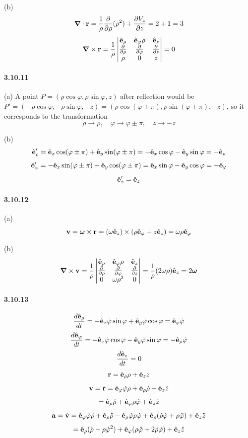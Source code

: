 \documentclass[a4paper]{article}
\begin{document}
(b) \[\boldsymbol{\nabla}\cdot\mathbf{r}=\frac{1}{\rho}\frac{\partial}{\partial\rho}(\rho^2)+\frac{\partial V_z}{\partial z}=2+1=3\] 
\[
\boldsymbol{\nabla}\times\mathbf{r}=\frac{1}{\rho}
\begin{vmatrix}
\hat{\mathbf{e}}_\rho&\hat{\mathbf{e}}_\varphi\rho&\hat{\mathbf{e}}_z\\
\frac{\partial}{\partial\rho}&\frac{\partial}{\partial\varphi}&\frac{\partial}{\partial z}\\
\rho&0&z
\end{vmatrix}=0
\]

\paragraph{3.10.11}
(a) A point $P=(\rho\cos\varphi,\rho\sin\varphi,z)$ after reflection would be $P'=(-\rho\cos\varphi,-\rho\sin\varphi,-z)=(\rho\cos(\varphi\pm\pi),\rho\sin(\varphi\pm\pi),-z)$, so it corresponds to the transformation 
\[
\rho\rightarrow\rho,\quad\varphi\rightarrow\varphi\pm\pi,\quad z\rightarrow-z
\]

(b) 
\[
\hat{\mathbf{e}}_\rho'=\hat{\mathbf{e}}_x\cos(\varphi\pm\pi)+\hat{\mathbf{e}}_y\sin(\varphi\pm\pi)=-\hat{\mathbf{e}}_x\cos\varphi-\hat{\mathbf{e}}_y\sin\varphi=-\hat{\mathbf{e}}_\rho
\]
\[
\hat{\mathbf{e}}_\varphi'=-\hat{\mathbf{e}}_x\sin(\varphi\pm\pi)+\hat{\mathbf{e}}_y\cos(\varphi\pm\pi)=\hat{\mathbf{e}}_x\sin\varphi-\hat{\mathbf{e}}_y\cos\varphi=-\hat{\mathbf{e}}_\varphi
\]
\[
\hat{\mathbf{e}}_z'=\hat{\mathbf{e}}_z
\]

\paragraph{3.10.12}
(a) 
\[
\mathbf{v}=\boldsymbol{\omega}\times\mathbf{r}=(\omega\hat{\mathbf{e}}_z)\times(\rho\hat{\mathbf{e}}_\varphi+z\hat{\mathbf{e}}_z)=\omega\rho\hat{\mathbf{e}}_\varphi
\]

(b)
\[
\boldsymbol{\nabla}\times\mathbf{v}=\frac{1}{\rho}
\begin{vmatrix}
\hat{\mathbf{e}}_\rho&\hat{\mathbf{e}}_\varphi\rho&\hat{\mathbf{e}}_z\\
\frac{\partial}{\partial\rho}&\frac{\partial}{\partial\varphi}&\frac{\partial}{\partial z}\\
0&\omega\rho^2&0
\end{vmatrix}=
\frac{1}{\rho}(2\omega\rho)\hat{\mathbf{e}}_z=2\boldsymbol{\omega}
\]

\paragraph{3.10.13}
\[
\frac{d\hat{\mathbf{e}}_\rho}{dt}=-\hat{\mathbf{e}}_x\dot{\varphi}\sin\varphi+\hat{\mathbf{e}}_y\dot{\varphi}\cos\varphi=\hat{\mathbf{e}}_\varphi\dot{\varphi}
\]
\[
\frac{d\hat{\mathbf{e}}_\varphi}{dt}=-\hat{\mathbf{e}}_x\dot{\varphi}\cos\varphi-\hat{\mathbf{e}}_y\dot{\varphi}\sin\varphi=-\hat{\mathbf{e}}_\rho\dot{\varphi}
\]
\[
\frac{d\hat{\mathbf{e}}_z}{dt}=0
\]
\[
\mathbf{r}=\hat{\mathbf{e}}_\rho\rho+\hat{\mathbf{e}}_z z
\]
\[
\mathbf{v}=\dot{\mathbf{r}}=\hat{\mathbf{e}}_\varphi\dot{\varphi}\rho+\hat{\mathbf{e}}_\rho\dot{\rho}+\hat{\mathbf{e}}_z\dot{z}\]
\[
=\hat{\mathbf{e}}_\rho\dot{\rho}+\hat{\mathbf{e}}_\varphi\rho\dot{\varphi}+\hat{\mathbf{e}}_z\dot{z}
\]
\[
\mathbf{a}=\dot{\mathbf{v}}=\hat{\mathbf{e}}_\varphi\dot{\varphi}\dot{\rho}+\hat{\mathbf{e}}_\rho\Ddot{\rho}-\hat{\mathbf{e}}_\rho\dot{\varphi}\rho\dot{\varphi}+\hat{\mathbf{e}}_\rho(\dot{\rho}\dot{\varphi}+\rho\Ddot{\varphi})+\hat{\mathbf{e}}_z\Ddot{z}
\]
\[
=\hat{\mathbf{e}}_\rho(\Ddot{\rho}-\rho\dot{\varphi
}^2)+\hat{\mathbf{e}}_\varphi(\rho\Ddot{\varphi}+2\dot{\rho}\dot{\varphi})+\hat{\mathbf{e}}_z\Ddot{z}
\]
\end{document}
